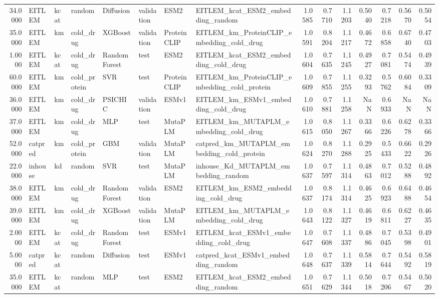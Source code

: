 \begin{tabular}{rlllllllrrrrrrr}
34.0000 & EITLEM & kcat & random & Diffusion & validation & ESM2 & EITLEM_kcat_ESM2_embedding_random & 1.0585 & 0.7710 & 1.1203 & 0.5040 & 0.7218 & 0.5670 & 0.5054 \\
35.0000 & EITLEM & km & cold_drug & XGBoost & validation & ProteinCLIP & EITLEM_km_ProteinCLIP_embedding_cold_drug & 1.0591 & 0.8204 & 1.1217 & 0.4672 & 0.6858 & 0.6740 & 0.4703 \\
1.0000 & EITLEM & kcat & cold_drug & Random Forest & test & ESM2 & EITLEM_kcat_ESM2_embedding_cold_drug & 1.0604 & 0.7635 & 1.1245 & 0.4927 & 0.7081 & 0.5474 & 0.4939 \\
60.0000 & EITLEM & km & cold_protein & SVR & test & ProteinCLIP & EITLEM_km_ProteinCLIP_embedding_cold_protein & 1.0609 & 0.7855 & 1.1255 & 0.3293 & 0.5762 & 0.6084 & 0.3309 \\
36.0000 & EITLEM & km & cold_drug & PSICHIC & validation & ESMv1 & EITLEM_km_ESMv1_embedding_cold_drug & 1.0610 & 0.7881 & 1.1258 & NaN & 0.6933 & NaN & NaN \\
37.0000 & EITLEM & km & cold_drug & MLP & test & MutaPLM & EITLEM_km_MUTAPLM_embedding_cold_drug & 1.0615 & 0.8050 & 1.1267 & 0.3366 & 0.6226 & 0.6278 & 0.3366 \\
52.0000 & catpred & km & cold_protein & GBM & validation & MutaPLM & catpred_km_MUTAPLM_embedding_cold_protein & 1.0624 & 0.8270 & 1.1288 & 0.2925 & 0.5433 & 0.6622 & 0.2926 \\
22.0000 & inhouse & kd & random & SVR & test & MutaPLM & inhouse_Kd_MUTAPLM_embedding_random & 1.0637 & 0.7597 & 1.1314 & 0.4863 & 0.7012 & 0.5288 & 0.4892 \\
38.0000 & EITLEM & km & cold_drug & Random Forest & validation & ESM2 & EITLEM_km_ESM2_embedding_cold_drug & 1.0637 & 0.8174 & 1.1314 & 0.4625 & 0.6923 & 0.6488 & 0.4654 \\
39.0000 & EITLEM & km & cold_drug & XGBoost & validation & MutaPLM & EITLEM_km_MUTAPLM_embedding_cold_drug & 1.0643 & 0.8122 & 1.1327 & 0.4619 & 0.6811 & 0.6227 & 0.4635 \\
2.0000 & EITLEM & kcat & cold_drug & Random Forest & test & ESMv1 & EITLEM_kcat_ESMv1_embedding_cold_drug & 1.0647 & 0.7608 & 1.1337 & 0.4886 & 0.7045 & 0.5398 & 0.4901 \\
5.0000 & catpred & kcat & random & Diffusion & test & ESMv1 & catpred_kcat_ESMv1_embedding_random & 1.0648 & 0.7637 & 1.1339 & 0.5814 & 0.7644 & 0.5492 & 0.5819 \\
35.0000 & EITLEM & kcat & random & MLP & test & ESM2 & EITLEM_kcat_ESM2_embedding_random & 1.0651 & 0.7629 & 1.1344 & 0.5018 & 0.7206 & 0.5467 & 0.5020 \\

\end{tabular}
